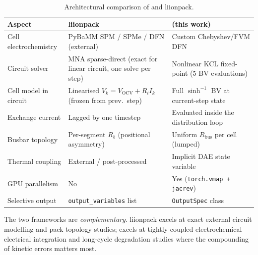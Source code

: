 \begin{table}[H]
\centering
\caption{Architectural comparison of \VIBE{} and liionpack.}
\label{tab:framework_comparison}
\begin{tabular}{p{3.5cm}p{5.2cm}p{5.2cm}}
\toprule
\textbf{Aspect} & \textbf{liionpack~\cite{Tranter2022}} & \textbf{\VIBE{} (this work)} \\
\midrule
Cell electrochemistry   & PyBaMM SPM / SPMe / DFN (external)
                        & Custom Chebyshev/FVM DFN \\[4pt]
Circuit solver          & MNA sparse-direct (exact for linear circuit, one solve per step)
                        & Nonlinear KCL fixed-point (5 BV evaluations) \\[4pt]
Cell model in circuit   & Linearised $V_k = V_\text{OCV} + R_i I_k$ (frozen from prev.\ step)
                        & Full $\sinh^{-1}$ BV at current-step state \\[4pt]
Exchange current        & Lagged by one timestep
                        & Evaluated inside the distribution loop \\[4pt]
Busbar topology         & Per-segment $R_b$ (positional asymmetry)
                        & Uniform $R_\text{bus}$ per cell (lumped) \\[4pt]
Thermal coupling        & External / post-processed
                        & Implicit DAE state variable \\[4pt]
GPU parallelism         & No
                        & Yes (\texttt{torch.vmap + jacrev}) \\[4pt]
Selective output        & \texttt{output\_variables} list
                        & \texttt{OutputSpec} class \\
\bottomrule
\end{tabular}
\end{table}

The two frameworks are \emph{complementary}. liionpack excels at exact external circuit modelling and pack topology studies; \VIBE{} excels at tightly-coupled electrochemical-electrical integration and long-cycle degradation studies where the compounding of kinetic errors matters most.
